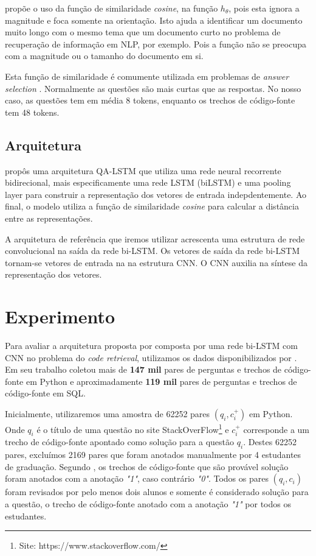 \documentclass[12pt]{article}
\begin{document}
\cite{tan-lstm-qa} propõe o uso da função de similaridade \textit{cosine}, na função $h_{\theta}$, pois esta ignora a magnitude e foca somente na orientação.
Isto ajuda a identificar um documento muito longo com o mesmo tema que um documento curto no problema de recuperação de informação em NLP, por exemplo. Pois a função não se preocupa
com a magnitude ou o tamanho do documento em si. 

Esta função de similaridade é comumente utilizada em problemas de \textit{answer selection} \cite{feng-answer-selection-2015}. Normalmente as questões são mais curtas que as respostas. No nosso caso, as questões tem em média 8 tokens, enquanto os trechos de código-fonte tem 48 tokens.

\subsection{Arquitetura}

\cite{tan-lstm-qa} propôs uma arquitetura QA-LSTM que utiliza uma rede neural recorrente bidirecional, mais especificamente uma rede LSTM (biLSTM) \cite{hochreiter-Schmidhuber-lstm-1997} e uma pooling layer para construir a representação dos vetores de entrada indepdentemente. Ao final, o modelo utiliza a função de similaridade \textit{cosine} para calcular a distância
entre as representações. 

A arquitetura de referência que iremos utilizar acrescenta uma estrutura de rede convolucional na saída da rede bi-LSTM. Os vetores de saída da rede bi-LSTM tornam-se vetores de entrada na na estrutura CNN. O CNN auxilia na síntese da representação dos vetores.

\section{Experimento}\label{sec:experimento}

Para avaliar a arquitetura proposta por \cite{tan-lstm-qa} composta por uma rede bi-LSTM com CNN no problema do \textit{code retrieval}, utilizamos os dados disponibilizados por \cite{Yao-staqc:2018}. Em seu trabalho \cite{Yao-staqc:2018} coletou mais de \textbf{147 mil} pares de perguntas e trechos de código-fonte em Python e aproximadamente \textbf{119 mil} pares de perguntas e trechos de código-fonte em SQL. 

Inicialmente, utilizaremos uma amostra de 62252 pares $(q_{i}, c_{i}^{+})$ em Python. Onde $q_{i}$ é o título de uma questão no site StackOverFlow\footnote{Site: https://www.stackoverflow.com/} e $c_{i}^{+}$ corresponde a um trecho de código-fonte apontado como solução para a questão $q_{i}$. Destes 62252 pares, excluímos 2169 pares que foram anotados manualmente por 4 estudantes de graduação. Segundo \cite{Yao-staqc:2018}, os trechos de código-fonte que são provável solução foram anotados com a anotação \emph{"1"}, caso contrário \emph{"0"}. Todos os pares $(q_{i}, c_{i})$ foram revisados por pelo menos dois alunos e somente é considerado solução para a questão, o trecho de código-fonte anotado com a anotação \emph{"1"} por todos os estudantes.
\end{document}
